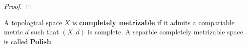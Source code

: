 \begin{proof}
% 

\end{proof}


\begin{definition}
A topological space $X$ is \textbf{completely metrizable} if it admits a compatiable
metric $d$ such that $(X,d)$ is complete. A separble completely metrizable space
is called \textbf{Polish}.
\end{definition}

